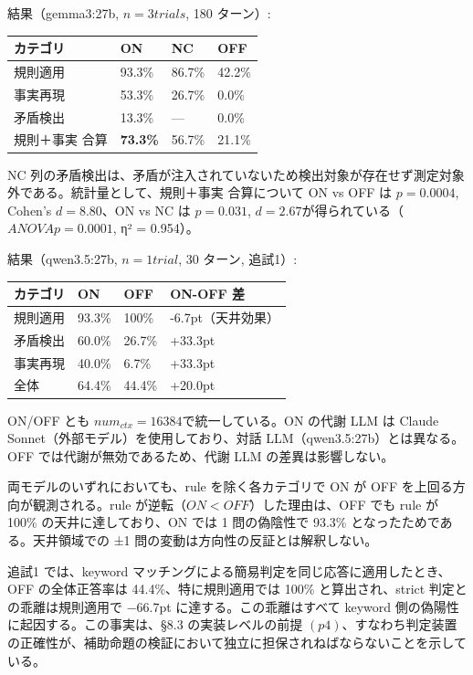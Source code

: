 \documentclass[12pt,a4paper]{article}
\begin{document}
結果（gemma3:27b, \(n=3 trials\), 180 ターン）:

{\def\LTcaptype{table} %
\begin{longtable}[]{@{}llll@{}}
\toprule\noalign{}
カテゴリ & ON & NC & OFF \\
\midrule\noalign{}
\endhead
\bottomrule\noalign{}
\endlastfoot
規則適用 & 93.3\% & 86.7\% & 42.2\% \\
事実再現 & 53.3\% & 26.7\% & 0.0\% \\
矛盾検出 & 13.3\% & --- & 0.0\% \\
規則＋事実 合算 & \textbf{73.3\%} & 56.7\% & 21.1\% \\
\end{longtable}
}

NC 列の矛盾検出は、矛盾が注入されていないため検出対象が存在せず測定対象外である。統計量として、規則＋事実 合算について ON vs OFF は \(p = 0.0004\), Cohen's \(d = 8.80\)、ON vs NC は \(p = 0.031\), \(d = 2.67\)が得られている（\(ANOVA p = 0.0001\), η² = 0.954）。

結果（qwen3.5:27b, \(n=1 trial\), 30 ターン, 追試1）:

{\def\LTcaptype{table} %
\begin{longtable}[]{@{}llll@{}}
\toprule\noalign{}
カテゴリ & ON & OFF & ON-OFF 差 \\
\midrule\noalign{}
\endhead
\bottomrule\noalign{}
\endlastfoot
規則適用 & 93.3\% & 100\% & -6.7pt（天井効果） \\
矛盾検出 & 60.0\% & 26.7\% & +33.3pt \\
事実再現 & 40.0\% & 6.7\% & +33.3pt \\
全体 & 64.4\% & 44.4\% & +20.0pt \\
\end{longtable}
}

ON/OFF とも \(num_{ctx}=16384\)で統一している。ON の代謝 LLM は Claude Sonnet（外部モデル）を使用しており、対話 LLM（qwen3.5:27b）とは異なる。OFF では代謝が無効であるため、代謝 LLM の差異は影響しない。

両モデルのいずれにおいても、rule を除く各カテゴリで ON が OFF を上回る方向が観測される。rule が逆転（\(ON < OFF\)）した理由は、OFF でも rule が 100\% の天井に達しており、ON では 1 問の偽陰性で 93.3\% となったためである。天井領域での ±1 問の変動は方向性の反証とは解釈しない。

追試1 では、keyword マッチングによる簡易判定を同じ応答に適用したとき、OFF の全体正答率は 44.4\%、特に規則適用では 100\% と算出され、strict 判定との乖離は規則適用で −66.7pt に達する。この乖離はすべて keyword 側の偽陽性に起因する。この事実は、§8.3 の実装レベルの前提 \((p4)\)、すなわち判定装置の正確性が、補助命題の検証において独立に担保されねばならないことを示している。
\end{document}
